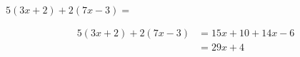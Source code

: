 $5(3x + 2) + 2(7x - 3) =$

\begin{solutionbox}{2.5cm}
    \begin{align*}
        5(3x + 2) + 2(7x - 3) & =15x+10+14x-6 \\
                              & =29x+4
    \end{align*}
\end{solutionbox}
